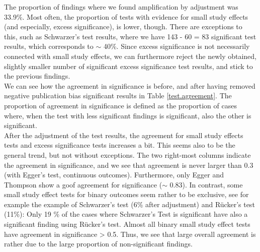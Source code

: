 The proportion of findings where we found amplification by adjustment was 33.9\%. Most often, the proportion of tests with evidence for small study effects (and especially, excess significance), is lower, though. There are exceptions to this, such as Schwarzer's test results, where we have 143 - 60 = 83 significant test results, which corresponds to $\sim$ 40\%. Since excess significance is not necessarily connected with small study effects, we can furthermore reject the newly obtained, slightly smaller number of significant excess significance test results, and stick to the previous findings. \\
We can see how the agreement in significance is before, and after having removed negative publication bias significant results in Table \ref{test.agreement}. The proportion of agreement in significance is defined as the proportion of cases where, when the test with less significant findings is significant, also the other is significant. \\
After the adjustment of the test results, the agreement for small study effects tests and excess significance tests increases a bit. This seems also to be the general trend, but not without exceptions. The two right-most columns indicate the agreement in significance, and we see that agreement is never larger than 0.3 (with Egger's test, continuous outcomes). Furthermore, only Egger and Thompson show a goof agreement for significance ($\sim$ 0.83). In contrast, some small study effect tests for binary outcomes seem rather to be exclusive, see for example the example of Schwarzer's test (6\% after adjustment) and R\"ucker's test (11\%): Only 19 \% of the cases where Schwarzer's Test is significant have also a significant finding using R\"ucker's test. Almost all binary small study effect tests have agreement in significance > 0.5. Thus, we see that large overall agreement is rather due to the large proportion of non-significant findings.





